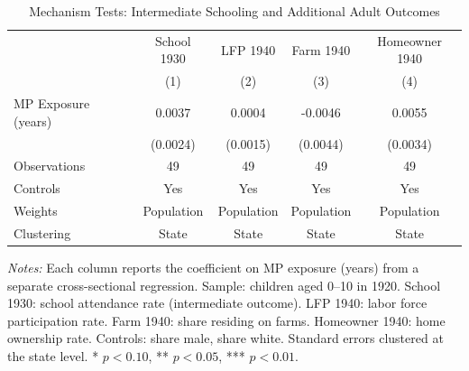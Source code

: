 \begin{table}[H]
\centering
\caption{Mechanism Tests: Intermediate Schooling and Additional Adult Outcomes}
\begin{threeparttable}
\begin{tabular}{lcccc}
\toprule
 & School 1930 & LFP 1940 & Farm 1940 & Homeowner 1940 \\
 & (1) & (2) & (3) & (4) \\
\midrule
MP Exposure (years) & 0.0037 & 0.0004 & -0.0046 & 0.0055 \\
 & (0.0024) & (0.0015) & (0.0044) & (0.0034) \\[6pt]
Observations & 49 & 49 & 49 & 49 \\
Controls & Yes & Yes & Yes & Yes \\
Weights & Population & Population & Population & Population \\
Clustering & State & State & State & State \\
\bottomrule
\end{tabular}
\begin{tablenotes}[flushleft]
\small
\item \textit{Notes:} Each column reports the coefficient on MP exposure (years) from a separate cross-sectional regression. Sample: children aged 0--10 in 1920. School 1930: school attendance rate (intermediate outcome). LFP 1940: labor force participation rate. Farm 1940: share residing on farms. Homeowner 1940: home ownership rate. Controls: share male, share white. Standard errors clustered at the state level. * $p<0.10$, ** $p<0.05$, *** $p<0.01$.
\end{tablenotes}
\end{threeparttable}
\label{tab:mechanisms}
\end{table}
